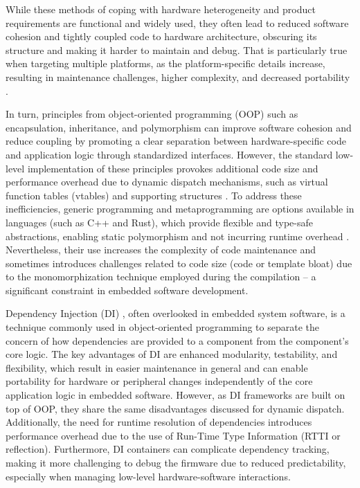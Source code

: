 \documentclass[10pt,sigplan,screen,anonymous]{acmart}
\begin{document}
While these methods of coping with hardware heterogeneity and product requirements are functional and widely used, they often lead to reduced software cohesion and tightly coupled code to hardware architecture, obscuring its structure and making it harder to maintain and debug. That is particularly true when targeting multiple platforms, as the platform-specific details increase, resulting in maintenance challenges, higher complexity, and decreased portability \cite{pappas2024semantic,ernst2002empirical,cppdesign}.

In turn, principles from object-oriented programming (OOP) such as encapsulation, inheritance, and polymorphism can improve software cohesion and reduce coupling by promoting a clear separation between hardware-specific code and application logic through standardized interfaces. However, the standard low-level implementation of these principles provokes additional code size and performance overhead due to dynamic dispatch mechanisms, such as virtual function tables (vtables) and supporting structures \cite{bauer2021novt}. To address these inefficiencies, generic programming and metaprogramming are options available in languages (such as C++ and Rust), which provide flexible and type-safe abstractions, enabling static polymorphism and not incurring runtime overhead \cite{juhasz2023modern}. Nevertheless, their use increases the complexity of code maintenance and sometimes introduces challenges related to code size (code or template bloat) due to the monomorphization technique employed during the compilation \cite{rust2022} -- a significant constraint in embedded software development.


Dependency Injection (DI) \cite{seemann2019dependency}, often overlooked in embedded system software, is a technique commonly used in object-oriented programming to separate the concern of how dependencies are provided to a component from the component's core logic. The key advantages of DI are enhanced modularity, testability, and flexibility, which result in easier maintenance in general and can enable portability for hardware or peripheral changes independently of the core application logic in embedded software. However, as DI frameworks are built on top of OOP, they share the same disadvantages discussed for dynamic dispatch. Additionally, the need for runtime resolution of dependencies introduces performance overhead due to the use of Run-Time Type Information (RTTI or reflection). Furthermore, DI containers can complicate dependency tracking, making it more challenging to debug the firmware due to reduced predictability, especially when managing low-level hardware-software interactions.
\end{document}
